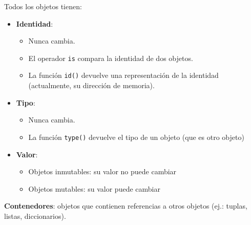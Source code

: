 \documentclass{beamer}
\begin{document}
\begin{frame}[fragile]



Todos los objetos tienen:
\begin{itemize}
\item {\bf Identidad}: 
  \begin{footnotesize}
    \begin{itemize}
    \item Nunca cambia. 
    \item El operador \verb|is| compara la identidad de dos objetos.
    \item La función \verb|id()| devuelve una representación de la
      identidad (actualmente, su dirección de memoria).
  \end{itemize}
\end{footnotesize}
\item {\bf Tipo}:
  \begin{footnotesize}
    \begin{itemize}
    \item Nunca cambia.
    \item La función \verb|type()| devuelve el tipo de un objeto (que
      es otro objeto) 
    \end{itemize}
  \end{footnotesize}
\item {\bf Valor}:
  \begin{footnotesize}
    \begin{itemize}
    \item Objetos inmutables: su valor no puede cambiar
    \item Objetos mutables: su valor puede cambiar
    \end{itemize}
  \end{footnotesize}
\end{itemize}
{\bf Contenedores}: objetos que contienen referencias a otros objetos
(ej.: tuplas, listas, diccionarios).

\end{frame}
\end{document}
